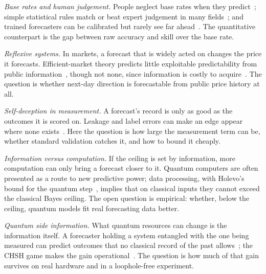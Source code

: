 \documentclass[journal]{IEEEtran}
\theoremstyle{definition}
\begin{document}
\emph{Base rates and human judgement.} People neglect base rates when they predict~\cite{kahneman1973psychology}; simple statistical rules match or beat expert judgement in many fields~\cite{meehl1954clinical}; and trained forecasters can be calibrated but rarely see far ahead~\cite{tetlock2015superforecasting}. The quantitative counterpart is the gap between raw accuracy and skill over the base rate.

\emph{Reflexive systems.} In markets, a forecast that is widely acted on changes the price it forecasts. Efficient-market theory predicts little exploitable predictability from public information~\cite{fama1970efficient}, though not none, since information is costly to acquire~\cite{grossman1980impossibility}. The question is whether next-day direction is forecastable from public price history at all.

\emph{Self-deception in measurement.} A forecast's record is only as good as the outcomes it is scored on. Leakage and label errors can make an edge appear where none exists~\cite{kapoor2023leakage,northcutt2021pervasive}. Here the question is how large the measurement term can be, whether standard validation catches it, and how to bound it cheaply.

\emph{Information versus computation.} If the ceiling is set by information, more computation can only bring a forecast closer to it. Quantum computers are often presented as a route to new predictive power; data processing, with Holevo's bound for the quantum step~\cite{holevo1973bounds}, implies that on classical inputs they cannot exceed the classical Bayes ceiling. The open question is empirical: whether, below the ceiling, quantum models fit real forecasting data better.

\emph{Quantum side information.} What quantum resources can change is the information itself. A forecaster holding a system entangled with the one being measured can predict outcomes that no classical record of the past allows~\cite{berta2010uncertainty}; the CHSH game makes the gain operational~\cite{clauser1969proposed,tsirelson1980quantum}. The question is how much of that gain survives on real hardware and in a loophole-free experiment.
\end{document}
